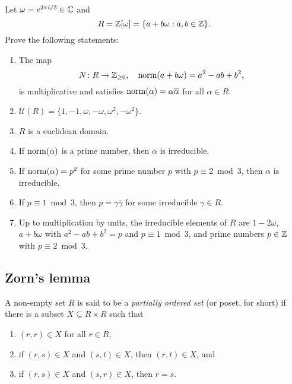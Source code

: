 \begin{bonus}
    \label{xca:Eisenstein}
    Let $\omega=e^{2\pi i/3}\in\mathbb{C}$ and 
    \[
    R=\mathbb{Z}[\omega]=\{a+b\omega:a,b\in\mathbb{Z}\}.
    \]
    Prove the following statements:
    \begin{enumerate}
        \item The map 
        \[
        N\colon R\to\mathbb{Z}_{\geq0},
        \quad
        \operatorname{norm}(a+b\omega)=a^2-ab+b^2,
        \]
        is multiplicative and 
        satisfies $\operatorname{norm}(\alpha)=\alpha\overline{\alpha}$
        for all $\alpha\in R$. 
        \item $\mathcal{U}(R)=\{1,-1,\omega,-\omega,\omega^2,-\omega^2\}$.
        \item $R$ is a euclidean domain.
        \item If $\operatorname{norm}(\alpha)$ is a prime number, then $\alpha$ is irreducible. 
        \item If $\operatorname{norm}(\alpha)=p^2$ for some 
            prime number $p$ with $p\equiv 2\bmod 3$, then 
            $\alpha$ is irreducible. 
        \item If $p\equiv 1\bmod 3$, then 
            $p=\gamma\overline{\gamma}$ for some 
            irreducible $\gamma\in R$.
        \item Up to multiplication by units, 
            the irreducible elements of $R$ are $1-2\omega$, 
            $a+b\omega$ with $a^2-ab+b^2=p$ and $p\equiv 1\bmod 3$, 
            and prime numbers $p\in\mathbb{Z}$ with $p\equiv 2\bmod 3$.
    \end{enumerate}
\end{bonus}


\subsection{Zorn's lemma}

\begin{definition}
A non-empty set $R$ is said to be a \emph{partially ordered set} (or poset, for short) 
if there is a subset $X\subseteq R\times R$ such that
\begin{enumerate}
    \item $(r,r)\in X$ for all $r\in R$, 
    \item if $(r,s)\in X$ and $(s,t)\in X$, then $(r,t)\in X$, and 
    \item if $(r,s)\in X$ and $(s,r)\in X$, then $r=s$. 
\end{enumerate}
\end{definition}

